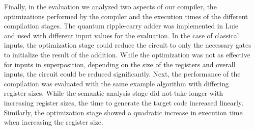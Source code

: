 Finally, in the evaluation we analyzed two aspects of our compiler, the optimizations performed by the compiler and the execution times of the different compilation stages. The quantum ripple-carry adder was implemented in Luie and used with different input values for the evaluation. In the case of classical inputs, the optimization stage could reduce the circuit to only the necessary gates to initialize the result of the addition. While the optimization was not as effective for inputs in superposition, depending on the size of the registers and overall inputs, the circuit could be reduced significantly. Next, the performance of the compilation was evaluated with the same example algorithm with differing register sizes. While the semantic analysis stage did not take longer with increasing register sizes, the time to generate the target code increased linearly. Similarly, the optimization stage showed a quadratic increase in execution time when increasing the register size.    